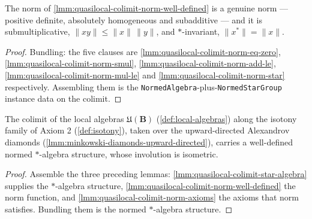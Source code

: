 \begin{lemma}
    \label{lmm:quasilocal-colimit-norm-axioms}
    The norm of \ref{lmm:quasilocal-colimit-norm-well-defined} is a genuine norm --- positive definite, absolutely homogeneous and subadditive --- and it is submultiplicative, $\|xy\| \le \|x\|\,\|y\|$, and $*$-invariant, $\|x^*\| = \|x\|$.
\end{lemma}
\begin{proof}
    Bundling: the five clauses are \ref{lmm:quasilocal-colimit-norm-eq-zero}, \ref{lmm:quasilocal-colimit-norm-smul}, \ref{lmm:quasilocal-colimit-norm-add-le}, \ref{lmm:quasilocal-colimit-norm-mul-le} and \ref{lmm:quasilocal-colimit-norm-star} respectively. Assembling them is the \texttt{NormedAlgebra}-plus-\texttt{NormedStarGroup} instance data on the colimit.
\end{proof}

\begin{lemma}
    \label{lmm:quasilocal-union-normed-star-algebra}
    The colimit of the local algebras $\mathfrak{U}(\mathbf{B})$ (\ref{def:local-algebras}) along the isotony family of Axiom 2 (\ref{def:isotony}), taken over the upward-directed Alexandrov diamonds (\ref{lmm:minkowski-diamonds-upward-directed}), carries a well-defined normed $*$-algebra structure, whose involution is isometric.
\end{lemma}
\begin{proof}
    Assemble the three preceding lemmas: \ref{lmm:quasilocal-colimit-star-algebra} supplies the $*$-algebra structure, \ref{lmm:quasilocal-colimit-norm-well-defined} the norm function, and \ref{lmm:quasilocal-colimit-norm-axioms} the axioms that norm satisfies. Bundling them is the normed $*$-algebra structure.
\end{proof}

